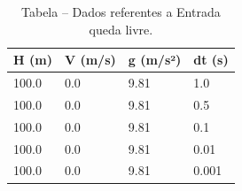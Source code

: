 \begin{table}[H]
\centering
\caption{Tabela – Dados referentes a Entrada queda livre.}
\label{tab:entrada_queda_livre}
\begin{tabular}{llll}
\toprule
H (m) & V (m/s) & g (m/s²) & dt (s) \\
\midrule
100.0 & 0.0 & 9.81 & 1.0 \\
100.0 & 0.0 & 9.81 & 0.5 \\
100.0 & 0.0 & 9.81 & 0.1 \\
100.0 & 0.0 & 9.81 & 0.01 \\
100.0 & 0.0 & 9.81 & 0.001 \\
\bottomrule
\end{tabular}

\end{table}
